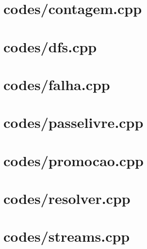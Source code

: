 \documentclass{article}
\begin{document}
\section*{codes/contagem.cpp}


\section*{codes/dfs.cpp}


\section*{codes/falha.cpp}


\section*{codes/passelivre.cpp}


\section*{codes/promocao.cpp}


\section*{codes/resolver.cpp}


\section*{codes/streams.cpp}

\end{document}
